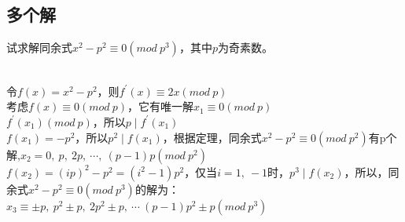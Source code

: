 \documentclass[cn,10pt]{elegantbook}
\begin{document}
\subsection{多个解}
\begin{example}
  试求解同余式$x^2-p^2 \equiv 0(mod\ p^3)$，其中$p$为奇素数。
\end{example}
\begin{solution}
  \\令$f(x)=x^2-p^2$，则$f^{\prime}(x) \equiv 2x(mod\ p)$
  \\考虑$f(x) \equiv 0(mod\ p)$，它有唯一解$x_1 \equiv 0(mod\ p)$
  \\$f^{\prime}(x_1)(mod\ p)$，所以$p \mid f^{\prime}(x_1)$
  \\$f(x_1) = -p^2$，所以$p^2 \mid f(x_1)$，根据定理，同余式$x^2-p^2 \equiv 0(mod\ p^2)$有p个解,$x_2 = 0,\ p,\ 2p,\ \cdots ,\ (p-1)p(mod\ p^2)$
  \\$f(x_2) = (ip)^2 - p^2 = (i^2-1)p^2$，仅当$i=1,\ -1$时，$p^3 \mid f(x_2)$，所以，同余式$x^2-p^2 \equiv 0(mod\ p^3)$的解为：$x_3 \equiv \pm p,\ p^2 \pm p,\ 2p^2 \pm p,\ \cdots \ (p-1)p^2 \pm p(mod\ p^3)$
\end{solution}
\end{document}
